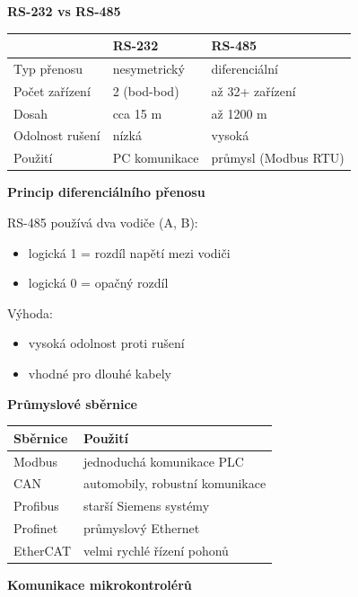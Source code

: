 \documentclass[a4paper,10pt]{article}
\begin{document}
\begin{vysvetlenibox}

\textbf{RS-232 vs RS-485}

\begin{center}
\begin{tabularx}{\linewidth}{l X X}
\toprule
 & RS-232 & RS-485 \\
\midrule
Typ přenosu & nesymetrický & diferenciální \\
Počet zařízení & 2 (bod-bod) & až 32+ zařízení \\
Dosah & cca 15 m & až 1200 m \\
Odolnost rušení & nízká & vysoká \\
Použití & PC komunikace & průmysl (Modbus RTU) \\
\bottomrule
\end{tabularx}
\end{center}

\textbf{Princip diferenciálního přenosu}

RS-485 používá dva vodiče (A, B):
\begin{itemize}
\item logická 1 = rozdíl napětí mezi vodiči
\item logická 0 = opačný rozdíl
\end{itemize}

Výhoda:
\begin{itemize}
\item vysoká odolnost proti rušení
\item vhodné pro dlouhé kabely
\end{itemize}

\textbf{Průmyslové sběrnice}

\begin{tabularx}{\linewidth}{l X}
\toprule
Sběrnice & Použití \\
\midrule
Modbus & jednoduchá komunikace PLC \\
CAN & automobily, robustní komunikace \\
Profibus & starší Siemens systémy \\
Profinet & průmyslový Ethernet \\
EtherCAT & velmi rychlé řízení pohonů \\
\bottomrule
\end{tabularx}

\textbf{Komunikace mikrokontrolérů}


\end{vysvetlenibox}
\end{document}
